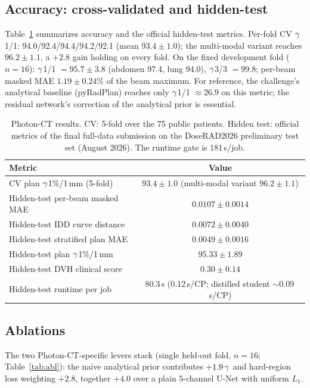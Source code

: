 \documentclass{llncs}
\begin{document}
\subsection{Accuracy: cross-validated and hidden-test}
Table~\ref{tab:res} summarizes accuracy and the official hidden-test metrics. Per-fold CV
$\gamma$1/1: 94.0/92.4/94.4/94.2/92.1 (mean $93.4\pm1.0$); the multi-modal variant reaches
$96.2\pm1.1$, a $+2.8$ gain holding on every fold. On the fixed development fold ($n=16$):
$\gamma$1/1 $=95.7\pm3.8$ (abdomen 97.4, lung 94.0), $\gamma$3/3 $=99.8$; per-beam masked MAE
$1.19\pm0.24$\% of the beam maximum. For reference, the challenge's analytical baseline
(pyRadPlan) reaches only $\gamma$1/1 $\approx26.9$ on this metric; the residual network's
correction of the analytical prior is essential.

\begin{table}[t]\centering
\caption{Photon-CT results. CV: 5-fold over the 75 public patients. Hidden test: official
metrics of the final full-data submission on the DoseRAD2026 preliminary test set (August 2026).
The runtime gate is 181\,s/job.}\label{tab:res}
\begin{tabular}{@{}lc@{}}\toprule
Metric & Value\\\midrule
CV plan $\gamma$1\%/1\,mm (5-fold) & $93.4\pm1.0$ (multi-modal variant $96.2\pm1.1$)\\
Hidden-test per-beam masked MAE & $0.0107\pm0.0014$\\
Hidden-test IDD curve distance & $0.0072\pm0.0040$\\
Hidden-test stratified plan MAE & $0.0049\pm0.0016$\\
Hidden-test plan $\gamma$1\%/1\,mm & $95.33\pm1.89$\\
Hidden-test DVH clinical score & $0.30\pm0.14$\\
Hidden-test runtime per job & 80.3\,s (0.12\,s/CP; distilled student $\sim$0.09\,s/CP)\\\bottomrule
\end{tabular}\end{table}

\subsection{Ablations}
The two Photon-CT-specific levers stack (single held-out fold, $n=16$; Table~\ref{tab:abl}):
the naive analytical prior contributes $+1.9\,\gamma$ and hard-region loss weighting $+2.8$,
together $+4.0$ over a plain 5-channel U-Net with uniform $L_1$.
\end{document}
